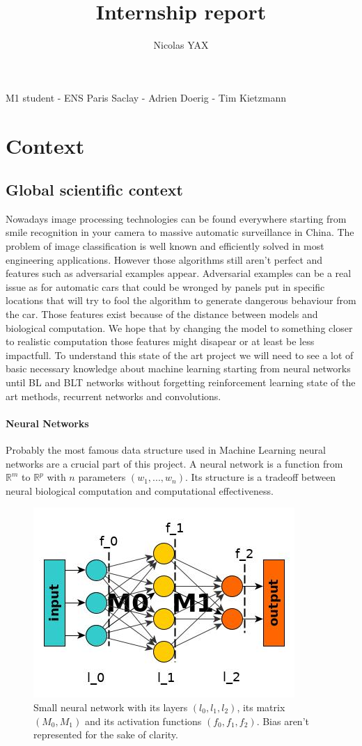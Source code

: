 \documentclass[11pt]{article}
\title{\textbf{Internship report}}
\author{Nicolas YAX}
\date{}
\begin{document}
\maketitle
M1 student - ENS Paris Saclay - Adrien Doerig - Tim Kietzmann
\section{Context}
\subsection{Global scientific context}
Nowadays image processing technologies can be found everywhere starting from smile recognition in your camera to massive automatic surveillance in China. The problem of image classification is well known and efficiently solved in most engineering applications. However those algorithms still aren't perfect and features such as adversarial examples appear. Adversarial examples can be a real issue as for automatic cars that could be wronged by panels put in specific locations that will try to fool the algorithm to generate dangerous behaviour from the car. Those features exist because of the distance between models and biological computation. We hope that by changing the model to something closer to realistic computation those features might disapear or at least be less impactfull.
To understand this state of the art project we will need to see a lot of basic necessary knowledge about machine learning starting from neural networks until BL and BLT networks without forgetting reinforcement learning state of the art methods, recurrent networks and convolutions.
\paragraph{Neural Networks}
Probably the most famous data structure used in Machine Learning neural networks are a crucial part of this project. A neural network is a function from $\mathbb{R}^m$ to $\mathbb{R}^p$ with $n$ parameters $(w_1,...,w_n)$. Its structure is a tradeoff between neural biological computation and computational effectiveness. 
\newpage
\begin{figure}[h]
\centering
\includegraphics[scale=0.40]{layers.jpg}
\caption{Small neural network with its layers $(l_0,l_1,l_2)$, its matrix $(M_0,M_1)$ and its activation functions $(f_0,f_1,f_2)$. Bias aren't represented for the sake of clarity.}
\label{layers}
\end{figure}
\end{document}
